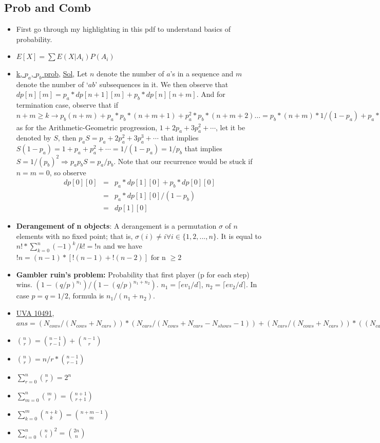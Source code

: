 \documentclass[8pt, a4paper, oneside, twocolumn]{extarticle}
\begin{document}
\subsection{Prob and Comb}
\begin{itemize}
    \item First go through my highlighting in this pdf to understand basics of probability.
    \item $E[X] = \sum E(X|A_i)P(A_i)$
    \item \href{https://codeforces.com/contest/908/problem/D}{k, $p_a$, $p_b$ prob}, \href{https://github.com/sourabhxyz/Competitive-Programming/blob/master/CF/Good%20Bye%202017/D.cpp}{Sol}, Let $n$ denote the number of $a$'s in a sequence and $m$ denote the number of `$ab$' subsequences in it. We then observe that $dp[n][m] = p_a * dp[n + 1][m] + p_b * dp[n][n + m]$. And for termination case, observe that if $n + m \geq k \rightarrow p_b(n + m) + p_a*p_b*(n + m + 1) + p_a^2*p_b*(n + m + 2)\dots = p_b * (n + m) * 1 / (1 - p_a) + p_a * p_b * (1 + 2 p_a + 3p_a^2 + \cdots) = (n + m) + \frac{p_a}{p_b}$ as for the Arithmetic-Geometric progression, $1+ 2p_a + 3p_a^2 + \cdots$, let it be denoted by $S$, then $p_aS = p_a + 2p_a^2 + 3p_a^3 + \cdots$ that implies $S(1 - p_a) = 1 + p_a + p_a^2 + \cdots = 1 / (1 - p_a) = 1 / p_b$ that implies $S = 1 / (p_b)^2 \Rightarrow p_a p_b S = p_a / p_b$. Note that our recurrence would be stuck if $n = m = 0$, so observe
    \begin{eqnarray}
    dp[0][0] & = & p_a * dp[1][0] + p_b * dp[0][0]\\
             & = & p_a * dp[1][0] / (1 - p_b)\\
             & = & dp[1][0]
    \end{eqnarray}
    \item \textbf{Derangement of n objects}: A derangement is a permutation $\sigma$ of $n$ elements with no fixed point; that is, $\sigma(i) \ne i \forall i \in \{1, 2, ..., n\}$. It is equal to $n! * \sum_{k = 0}^n (-1)^k / {k!} = !n$ and we have $!n = (n - 1) * [!(n - 1) + !(n - 2)] \text{ for n }\geq 2$
    \item \textbf{Gambler ruin's problem: }Probability that first player (p for each step) wins. $(1 - (q/p)^{n_1})/(1 - (q/p)^{n_1 + n_2})$. $n_1 = \lceil ev_1/d \rceil$, $n_2 = \lceil ev_2/d \rceil$. In case $p = q = 1/2$, formula is $n_1/(n_1 + n_2)$.
    \item \href{}{UVA 10491}, $ans = (N_{cows} / (N_{cows} + N_{cars})) * (N_{cars} / (N_{cows} + N_{cars} - N_{shows} - 1)) + (N_{cars} / (N_{cows} + N_{cars})) * ((N_{cars} - 1) / (N_{cows} + N_{cars} - N_{shows} - 1))$
    \item $\binom{n}{r} = \binom{n - 1}{r - 1} + \binom{n - 1}{r}$
    \item $\binom{n}{r} = n / r * \binom{n - 1}{r - 1}$
    \item $\sum_{r = 0}^n \binom{n}{r} = 2^n$
    \item $\sum_{m = 0}^n \binom{m}{r} = \binom{n + 1}{r + 1}$
    \item $\sum_{k = 0}^m \binom{n + k}{k} = \binom{n + m - 1}{m}$
    \item $\sum_{i = 0}^n \binom{n}{i}^2 = \binom{2n}{n}$
\end{itemize}
\end{document}
